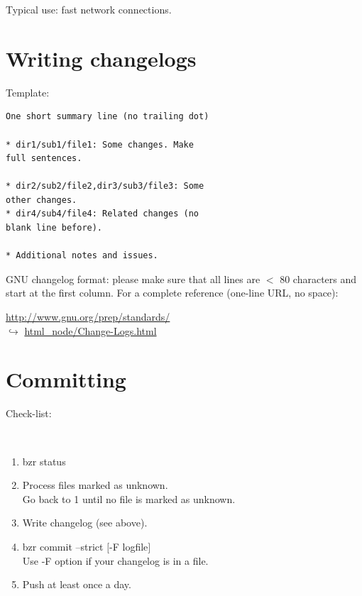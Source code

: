\documentclass[tumble,foldmark,a4paper]{leaflet}
\begin{document}
Typical use: fast network connections.

\newpage

\section*{Writing changelogs}

Template:

\vspace{-0.5em}

\begin{verbatim}
One short summary line (no trailing dot)

* dir1/sub1/file1: Some changes. Make
full sentences.

* dir2/sub2/file2,dir3/sub3/file3: Some
other changes.
* dir4/sub4/file4: Related changes (no
blank line before).

* Additional notes and issues.
\end{verbatim}

GNU changelog format: please make sure that all lines are $<$ 80
characters and start at the first column. For a complete reference
(one-line URL, no space):
\begin{center}
 \url{http://www.gnu.org/prep/standards/} \\
 $\hookrightarrow$ \url{html_node/Change-Logs.html}
\end{center}

\section*{Committing}

Check-list:
{\tt
\begin{enumerate}
 \item bzr status
 \item Process files marked as unknown. \\
       Go back to 1 until no file is marked as unknown.
 \item Write changelog (see above).
 \item bzr commit --strict $[$-F logfile$]$ \\
       Use -F option if your changelog is in a file.
 \item Push at least once a day.
\end{enumerate}
}

\vspace{0.5em}

\begin{center}
\colorbox{infobg}{}
\end{center}
\end{document}

